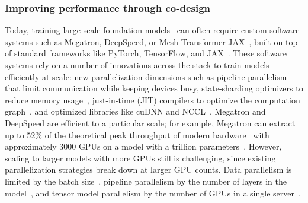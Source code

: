 \subsubsection{Improving performance through co-design} 
\label{sec:systems-co-design}

Today, training large-scale foundation models~\citep{brown2020gpt3, rae2021scaling, megatron_530b, gpt-j} can often require custom software systems such as Megatron, DeepSpeed, or Mesh Transformer JAX~\citep{shoeybi2019megatronlm, rasley2020deepspeed, mesh-transformer-jax}, built on top of standard frameworks like PyTorch, TensorFlow, and JAX~\citep{paszke2019pytorch, abadi2016tensorflow, jax2018github}. These software systems rely on a number of innovations across the stack to train models efficiently at scale: new parallelization dimensions such as pipeline parallelism~\citep{huang2019gpipe, narayanan2019pipedream} that limit communication while keeping devices busy, state-sharding optimizers to reduce memory usage~\citep{rajbhandari2020zero}, just-in-time (JIT) compilers to optimize the computation graph~\citep{pytorchjit}, and optimized libraries like cuDNN and NCCL~\citep{nccl}. Megatron and DeepSpeed are efficient to a particular scale; for example, Megatron can extract up to 52\% of the theoretical peak throughput of modern hardware~ with approximately 3000 GPUs on a model with a trillion parameters~\citep{narayanan2021efficient}. However, scaling to larger models with more GPUs still is challenging, since existing parallelization strategies break down at larger GPU counts. Data parallelism is limited by the batch size~\citep{li2020pytorch}, pipeline parallelism by the number of layers in the model~\citep{huang2019gpipe, narayanan2019pipedream}, and tensor model parallelism by the number of GPUs in a single server~\citep{shoeybi2019megatronlm}.

